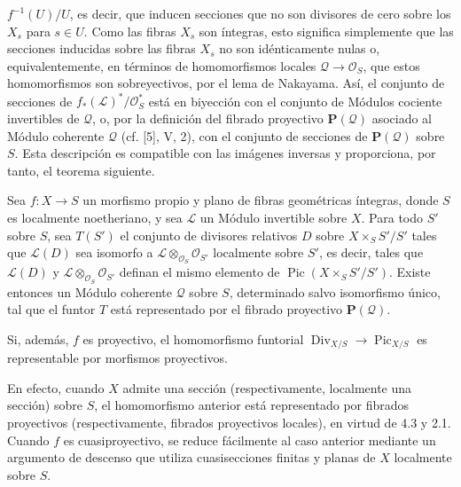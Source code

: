 $f^{-1}(U)/U$, es decir, que inducen secciones que no son divisores de cero
sobre los $X_s$ para $s\in U$. Como las fibras $X_s$ son íntegras, esto
significa simplemente que las secciones inducidas sobre las fibras $X_s$ no
son idénticamente nulas o, equivalentemente, en términos de homomorfismos
locales $\mathcal Q\longrightarrow\mathcal O_S$, que estos homomorfismos son
sobreyectivos, por el lema de Nakayama. Así, el conjunto de secciones de
$f_*(\mathcal L)^*/\mathcal O_S^*$ está en biyección con el conjunto de
Módulos cociente invertibles de $\mathcal Q$, o, por la definición del fibrado
proyectivo $\mathbf P(\mathcal Q)$ asociado al Módulo coherente $\mathcal Q$
(cf. [5], V, 2), con el conjunto de secciones de $\mathbf P(\mathcal Q)$ sobre
$S$. Esta descripción es compatible con las imágenes inversas y proporciona,
por tanto, el teorema siguiente.

 Sea $f:X\longrightarrow S$ un morfismo propio y plano de
fibras geométricas íntegras, donde $S$ es localmente noetheriano, y sea
$\mathcal L$ un Módulo invertible sobre $X$. Para todo $S'$ sobre $S$, sea
$T(S')$ el conjunto de divisores relativos $D$ sobre $X\times_SS'/S'$ tales
que $\mathcal L(D)$ sea isomorfo a
$\mathcal L\otimes_{\mathcal O_S}\mathcal O_{S'}$ localmente sobre $S'$, es decir, tales que
$\mathcal L(D)$ y $\mathcal L\otimes_{\mathcal O_S}\mathcal O_{S'}$ definan
el mismo elemento de $\operatorname{Pic}(X\times_SS'/S')$. Existe entonces un
Módulo coherente $\mathcal Q$ sobre $S$, determinado salvo isomorfismo único,
tal que el funtor $T$ está representado por el fibrado proyectivo
$\mathbf P(\mathcal Q)$.

 Si, además, $f$ es proyectivo, el homomorfismo funtorial
$\operatorname{Div}_{X/S}\longrightarrow\operatorname{Pic}_{X/S}$ es
representable por morfismos proyectivos.

En efecto, cuando $X$ admite una sección (respectivamente, localmente una
sección) sobre $S$, el homomorfismo anterior está representado por fibrados
proyectivos (respectivamente, fibrados proyectivos locales), en virtud de 4.3 y
2.1. Cuando $f$ es cuasiproyectivo, se reduce fácilmente al caso anterior
mediante un argumento de descenso que utiliza cuasisecciones finitas y planas
de $X$ localmente sobre $S$.

